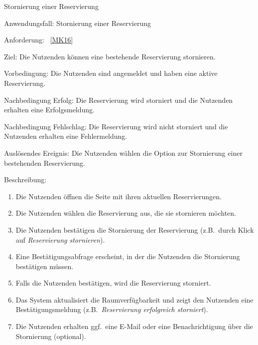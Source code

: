 \begin{function}{90}{Stornierung einer Reservierung}
    \item[Anwendungsfall:] Stornierung einer Reservierung
    \item[Anforderung:] ~\ref{MK16}
    \item[Ziel:] Die Nutzenden können eine bestehende Reservierung stornieren.
    \item[Vorbedingung:] Die Nutzenden sind angemeldet und haben eine aktive Reservierung.
    \item[Nachbedingung Erfolg:] Die Reservierung wird storniert und die Nutzenden erhalten eine Erfolgsmeldung.
    \item[Nachbedingung Fehlschlag:] Die Reservierung wird nicht storniert und die Nutzenden erhalten eine Fehlermeldung.
    \item[Auslösendes Ereignis:] Die Nutzenden wählen die Option zur Stornierung einer bestehenden Reservierung.
    \item[Beschreibung:] ~
    \begin{enumerate}
        \item Die Nutzenden öffnen die Seite mit ihren aktuellen Reservierungen.
        \item Die Nutzenden wählen die Reservierung aus, die sie stornieren möchten.
        \item Die Nutzenden bestätigen die Stornierung der Reservierung (z.B.\ durch Klick auf \textit{Reservierung stornieren}).
        \item Eine Bestätigungsabfrage erscheint, in der die Nutzenden die Stornierung bestätigen müssen.
        \item Falls die Nutzenden bestätigen, wird die Reservierung storniert.
        \item Das System aktualisiert die Raumverfügbarkeit und zeigt den Nutzenden eine Bestätigungsmeldung (z.B.\ \textit{Reservierung erfolgreich storniert}).
        \item Die Nutzenden erhalten ggf.\ eine E-Mail oder eine Benachrichtigung über die Stornierung (optional).
    \end{enumerate}
\end{function}

\pagebreak


